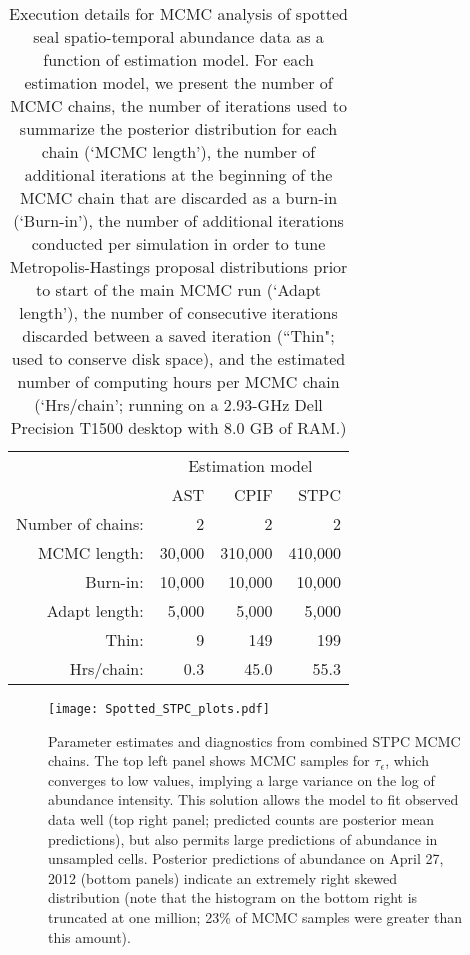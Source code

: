 \documentclass[12pt,fleqn]{article}
\begin{document}
\begin{flushleft}
\begin{table}
\caption{Execution details for MCMC analysis of spotted seal spatio-temporal abundance data as a function of estimation model.  For each estimation model, we present the number of MCMC chains, the number of iterations used to summarize the posterior distribution for each chain (`MCMC length'), the number of additional iterations at the beginning of the MCMC chain that are discarded as a burn-in (`Burn-in'), the number of additional iterations conducted per simulation in order to tune Metropolis-Hastings proposal distributions prior to start of the main MCMC run (`Adapt length'), the number of consecutive iterations discarded between a saved iteration (``Thin"; used to conserve disk space), and the estimated number of computing hours per MCMC chain (`Hrs/chain'; running on a 2.93-GHz Dell
Precision T1500 desktop with 8.0 GB of RAM.)}
\label{tab:run_times}
\begin{tabular}{rrrr}
\\
 & \multicolumn{3}{c}{Estimation model} \\
 & AST & CPIF & STPC \\
\hline \hline
Number of chains:  & 2 & 2 & 2 \\
MCMC length: & 30,000  & 310,000 & 410,000 \\
Burn-in: & 10,000 & 10,000 & 10,000  \\
Adapt length: & 5,000 & 5,000 & 5,000 \\
Thin:  & 9 & 149 & 199 \\
Hrs/chain:   & 0.3 & 45.0 & 55.3 \\
\hline
\end{tabular}
\end{table}

\clearpage


\begin{figure*}
\begin{center}
\texttt{[image: Spotted\_STPC\_plots.pdf]}
\caption{Parameter estimates and diagnostics from combined STPC MCMC chains.  The top left panel shows MCMC samples for $\tau_\epsilon$, which converges to low values, implying a large variance on the log of abundance intensity.  This solution allows the model to fit observed data well (top right panel; predicted counts are posterior mean predictions), but also permits large predictions of abundance in unsampled cells.  Posterior predictions of abundance on April 27, 2012 (bottom panels) indicate an extremely right skewed distribution (note that the histogram on the bottom right is truncated at one million; 23\% of MCMC samples were greater than this amount).} \label{fig:STPC_results}
\end{center}
\end{figure*}


\end{flushleft}
\end{document}
